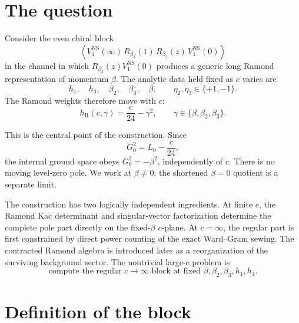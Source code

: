 \documentclass[11pt]{article}
\newcommand{\R}{\mathrm R}
\newcommand{\NS}{\mathrm{NS}}
\begin{document}
\tableofcontents

\section{The question}

Consider the even chiral block
\begin{equation}
 \left\langle
 V^{\NS}_4(\infty)\,
 R_{\beta_3}(1)\,
 R_{\beta_2}(z)\,
 V^{\NS}_1(0)
 \right\rangle
 \label{eq:four-point-ordering}
\end{equation}
in the channel in which \(R_{\beta_2}(z)V^{\NS}_1(0)\) produces a
generic long Ramond representation of momentum \(\beta\).  The analytic
data held fixed as \(c\) varies are
\begin{equation}
 h_1,\quad h_4,\quad
 \beta_2,\quad\beta_3,\quad\beta,
 \qquad
 \eta_2,\eta_3\in\{+1,-1\}.
 \label{eq:fixed-data}
\end{equation}
The Ramond weights therefore move with \(c\):
\begin{equation}
 h_\R(c,\gamma)=\frac{c}{24}-\gamma^2,
 \qquad
 \gamma\in\{\beta,\beta_2,\beta_3\}.
 \label{eq:fixed-beta-family}
\end{equation}

This is the central point of the construction.  Since
\begin{equation}
 G_0^2=L_0-\frac{c}{24},
 \label{eq:g0-square}
\end{equation}
the internal ground space obeys \(G_0^2=-\beta^2\), independently of
\(c\).  There is no moving level-zero pole.  We work at
\(\beta\ne0\); the shortened \(\beta=0\) quotient is a separate limit.

The construction has two logically independent ingredients.  At finite
\(c\), the Ramond Kac determinant and singular-vector factorization
determine the complete pole part directly on the fixed-\(\beta\)
\(c\)-plane.  At \(c=\infty\), the regular part is first constrained by
direct power counting of the exact Ward--Gram sewing.  The contracted
Ramond algebra is introduced later as a reorganization of the surviving
background sector.  The nontrivial large-\(c\) problem is
\begin{equation}
 \boxed{\text{compute the regular \(c\to\infty\) block at fixed
 \(\beta,\beta_2,\beta_3,h_1,h_4\).}}
 \label{eq:only-problem}
\end{equation}

\section{Definition of the block}
\end{document}

